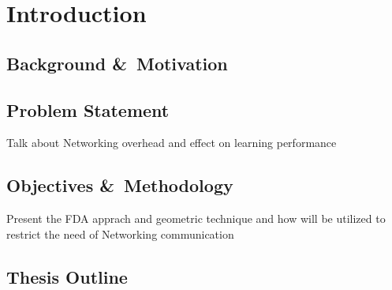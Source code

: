 \chapter{Introduction}

\section{Background \&\ Motivation}



\section{Problem Statement}
Talk about Networking overhead and effect on learning performance

\section{Objectives \&\ Methodology}
Present the FDA apprach and geometric technique and how will be utilized to restrict the need of Networking communication

\section{Thesis Outline}


